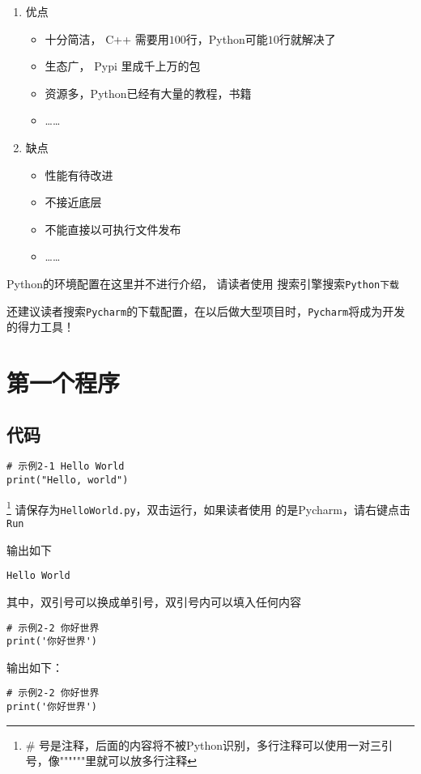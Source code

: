 \documentclass{book}
\begin{document}
\begin{enumerate}
\item 优点
    \begin{itemize}   
        \item 十分简洁， C++ 需要用$100$行，Python可能$10$行就解决了
        \item 生态广， Pypi 里成千上万的包
        \item 资源多，Python已经有大量的教程，书籍
        \item ……
    \end{itemize}
\item 缺点
    \begin{itemize}
        \item 性能有待改进
        \item 不接近底层
        \item 不能直接以可执行文件发布
        \item ……
    \end{itemize}
\end{enumerate}

Python的环境配置在这里并不进行介绍，
请读者使用
搜索引擎搜索\verb|Python下载|


还建议读者搜索\verb|Pycharm|的下载配置，在以后做大型项目时，\verb|Pycharm|将成为开发的得力工具！
\chapter{第一个程序}
\section{代码}
\begin{verbatim}
# 示例2-1 Hello World
print("Hello, world")
\end{verbatim}
\footnote{\# 号是注释，后面的内容将不被Python识别，多行注释可以使用一对三引号，像""""""里就可以放多行注释}
\indent 请保存为\verb|HelloWorld.py|，双击运行，如果读者使用
的是Pycharm，请右键点击\verb|Run|

输出如下

\begin{verbatim}
Hello World
\end{verbatim}

其中，双引号可以换成单引号，双引号内可以填入任何内容

\begin{verbatim}
# 示例2-2 你好世界
print('你好世界')
\end{verbatim}

输出如下：
\begin{verbatim}
# 示例2-2 你好世界
print('你好世界')
\end{verbatim}
\end{document}
